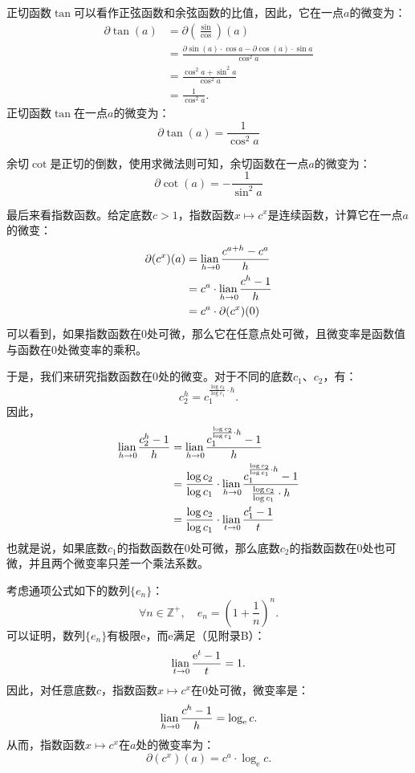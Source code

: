 \documentclass[12pt,UTF8]{ctexbook}
\begin{document}
正切函数$\tan$可以看作正弦函数和余弦函数的比值，因此，它在一点$a$的微变为：
\begin{align*}
    \partial \tan(a) &= \partial \left(\frac{\sin}{\cos}\right)(a)  \\
    &= \frac{\partial \sin(a) \cdot \cos{a} - \partial \cos(a) \cdot \sin{a}}{\cos^2{a}}  \\
    &= \frac{\cos^2{a} + \sin^2{a}}{\cos^2{a}}  \\
    &= \frac{1}{\cos^2{a}}.  
\end{align*}
正切函数$\tan$在一点$a$的微变为：
$$ \partial \tan(a) = \frac{1}{\cos^2{a}} $$

余切$\cot$是正切的倒数，使用求微法则可知，余切函数在一点$a$的微变为：
$$ \partial \cot(a) = -\frac{1}{\sin^2{a}} $$

最后来看指数函数。给定底数$c > 1$，指数函数$x\mapsto c^x$是连续函数，计算它在一点$a$的微变：
\begin{align*}
    \partial (c^x) (a) &= \underset{h\to 0}{\operatorname{lian}\,} \frac{c^{a+h} - c^a}{h}  \\
    &= c^a\cdot \underset{h\to 0}{\operatorname{lian}\,} \frac{c^h - 1}{h}  \\
    &= c^a \cdot \partial (c^x) (0) 
\end{align*}
可以看到，如果指数函数在$0$处可微，那么它在任意点处可微，且微变率是函数值与函数在$0$处微变率的乘积。

于是，我们来研究指数函数在$0$处的微变。对于不同的底数$c_1$、$c_2$，有：
$$c_2^h = c_1^{\frac{\log{c_2}}{\log{c_1}}\cdot h}.$$
因此，
\begin{align*}
    \underset{h\to 0}{\operatorname{lian}\,} \frac{c_2^h - 1}{h} &= \underset{h\to 0}{\operatorname{lian}\,} \frac{c_1^{\frac{\log{c_2}}{\log{c_1}}\cdot h} - 1}{h}  \\
    &= \frac{\log{c_2}}{\log{c_1}} \cdot \underset{h\to 0}{\operatorname{lian}\,} \frac{c_1^{\frac{\log{c_2}}{\log{c_1}}\cdot h} - 1}{\frac{\log{c_2}}{\log{c_1}} \cdot h}  \\
    &= \frac{\log{c_2}}{\log{c_1}} \cdot \underset{t\to 0}{\operatorname{lian}\,} \frac{c_1^{t} - 1}{t}  
\end{align*}
也就是说，如果底数$c_1$的指数函数在$0$处可微，那么底数$c_2$的指数函数在$0$处也可微，并且两个微变率只差一个乘法系数。

考虑通项公式如下的数列$\{e_n\}$：
$$ \forall n\in\mathbb{Z}^+,\quad e_n = \left(1 + \frac{1}{n}\right)^n.$$
可以证明，数列$\{e_n\}$有极限$\mathrm{e}$，而$\mathrm{e}$满足（见附录B）：
$$ \underset{t\to 0}{\operatorname{lian}\,} \frac{\mathrm{e}^{t} - 1}{t} = 1.$$
因此，对任意底数$c$，指数函数$x\mapsto c^x$在$0$处可微，微变率是：
$$ \underset{h\to 0}{\operatorname{lian}\,} \frac{c^h - 1}{h} = \log_{\mathrm{e}}{c}.$$
从而，指数函数$x\mapsto c^x$在$a$处的微变率为：
$$ \partial (c^x) (a) = c^a \cdot \log_{\mathrm{e}}{c}. $$
\end{document}
